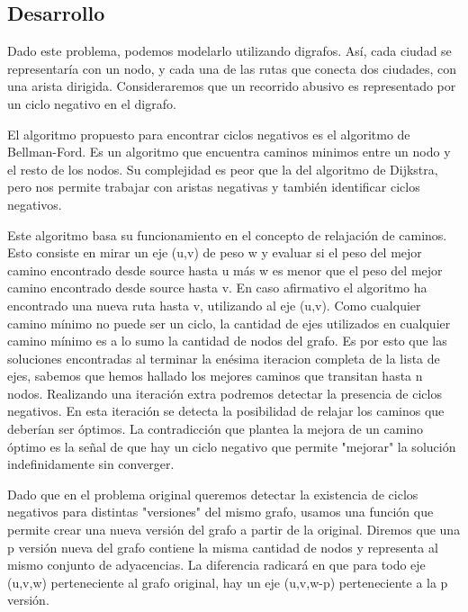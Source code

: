 \subsection{Desarrollo}
Dado este problema, podemos modelarlo utilizando digrafos. Así, cada ciudad se representaría con un nodo, y cada una de las rutas que conecta dos ciudades, con una arista dirigida. Consideraremos que un recorrido abusivo es representado por un ciclo negativo en el digrafo.
\\
\par
El algoritmo propuesto para encontrar ciclos negativos es el algoritmo de Bellman-Ford. Es un algoritmo que encuentra caminos minimos entre un nodo y el resto de los nodos. Su complejidad es peor que la del algoritmo de Dijkstra, pero nos permite trabajar con aristas negativas y también identificar ciclos negativos. 
\\
\par
Este algoritmo basa su funcionamiento en el concepto de relajación de caminos. Esto consiste en mirar un eje (u,v) de peso w y evaluar si el peso del mejor camino encontrado desde source hasta u más w es menor que el peso del mejor camino encontrado desde source hasta v. En caso afirmativo el algoritmo ha encontrado una nueva ruta hasta v, utilizando al eje (u,v). Como cualquier camino mínimo no puede ser un ciclo, la cantidad de ejes utilizados en cualquier camino mínimo es a lo sumo la cantidad de nodos del grafo. Es por esto que las soluciones encontradas al terminar la enésima iteracion completa de la lista de ejes, sabemos que hemos hallado los mejores caminos que transitan hasta n nodos. Realizando una iteración extra podremos detectar la presencia de ciclos negativos. En esta iteración se detecta la posibilidad de relajar los caminos que deberían ser óptimos. La contradicción que plantea la mejora de un camino óptimo es la señal de que hay un ciclo negativo que permite "mejorar" la solución indefinidamente sin converger.
\\
\par
Dado que en el problema original queremos detectar la existencia de ciclos negativos para distintas "versiones" del mismo grafo, usamos una función que permite crear una nueva versión del grafo a partir de la original. Diremos que una p versión nueva del grafo contiene la misma cantidad de nodos y representa al mismo conjunto de adyacencias. La diferencia radicará en que para todo eje (u,v,w) perteneciente al grafo original, hay un eje (u,v,w-p) perteneciente a la p versión.

